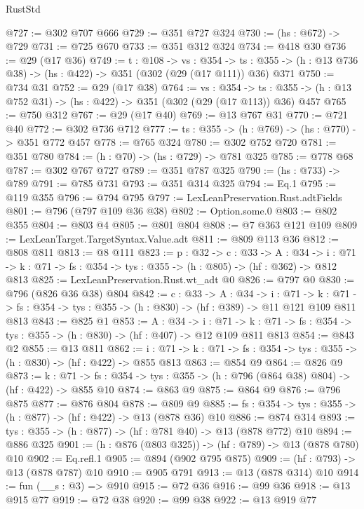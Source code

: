 \begin{lexlean}{RustStd}
\begin{coremodule}
@727 := @302 @707 @666
@729 := @351 @727 @324
@730 := (hs : @672) -> @729
@731 := @725 @670
@733 := @351 @312 @324
@734 := @418 @30
@736 := @29 (@17 @36)
@749 := {t : @108} ->
  {vs : @354} ->
  {ts : @355} -> (h : @13 @736 @38) -> (hs : @422) -> @351 (@302 (@29 (@17 @111)) @36) @371
@750 := @734 @31
@752 := @29 (@17 @38)
@764 := {vs : @354} ->
  {ts : @355} -> (h : @13 @752 @31) -> (hs : @422) -> @351 (@302 (@29 (@17 @113)) @36) @457
@765 := @750 @312
@767 := @29 (@17 @40)
@769 := @13 @767 @31
@770 := @721 @40
@772 := @302 @736 @712
@777 := {ts : @355} -> (h : @769) -> (hs : @770) -> @351 @772 @457
@778 := @765 @324
@780 := @302 @752 @720
@781 := @351 @780
@784 := (h : @70) -> (hs : @729) -> @781 @325
@785 := @778 @68
@787 := @302 @767 @727
@789 := @351 @787 @325
@790 := (hs : @733) -> @789
@791 := @785 @731
@793 := @351 @314 @325
@794 := Eq.{1}
@795 := @119 @355
@796 := @794 @795
@797 := LexLeanPreservation.Rust.adtFields
@801 := @796 (@797 @109 @36 @38)
@802 := Option.some.{0}
@803 := @802 @355
@804 := @803 @4
@805 := @801 @804
@808 := @7 @363 @121 @109
@809 := LexLeanTarget.TargetSyntax.Value.adt
@811 := @809 @113 @36
@812 := @808 @811
@813 := @8 @111
@823 := {p : @32} ->
  {c : @33} ->
  {A : @34} ->
  {i : @71} -> {k : @71} -> {fs : @354} -> {tys : @355} -> (h : @805) -> (hf : @362) -> @812 @813
@825 := LexLeanPreservation.Rust.wt_adt @0
@826 := @797 @0
@830 := @796 (@826 @36 @38) @804
@842 := {c : @33} ->
  {A : @34} ->
  {i : @71} ->
  {k : @71} -> {fs : @354} -> {tys : @355} -> (h : @830) -> (hf : @389) -> @11 @121 @109 @811 @813
@843 := @825 @1
@853 := {A : @34} ->
  {i : @71} ->
  {k : @71} -> {fs : @354} -> {tys : @355} -> (h : @830) -> (hf : @407) -> @12 @109 @811 @813
@854 := @843 @2
@855 := @13 @811
@862 := {i : @71} ->
  {k : @71} -> {fs : @354} -> {tys : @355} -> (h : @830) -> (hf : @422) -> @855 @813
@863 := @854 @9
@864 := @826 @9
@873 := {k : @71} ->
  {fs : @354} -> {tys : @355} -> (h : @796 (@864 @38) @804) -> (hf : @422) -> @855 @10
@874 := @863 @9
@875 := @864 @9
@876 := @796 @875
@877 := @876 @804
@878 := @809 @9
@885 := {fs : @354} -> {tys : @355} -> (h : @877) -> (hf : @422) -> @13 (@878 @36) @10
@886 := @874 @314
@893 := {tys : @355} -> (h : @877) -> (hf : @781 @40) -> @13 (@878 @772) @10
@894 := @886 @325
@901 := (h : @876 (@803 @325)) -> (hf : @789) -> @13 (@878 @780) @10
@902 := Eq.refl.{1}
@905 := @894 (@902 @795 @875)
@909 := (hf : @793) -> @13 (@878 @787) @10
@910 := @905 @791
@913 := @13 (@878 @314) @10
@914 := fun (__s : @3) => @910
@915 := @72 @36
@916 := @99 @36
@918 := @13 @915 @77
@919 := @72 @38
@920 := @99 @38
@922 := @13 @919 @77

\end{coremodule}
\end{lexlean}
